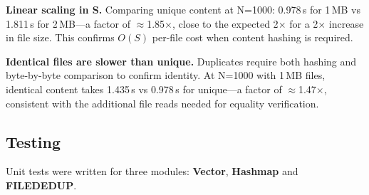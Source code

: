 \textbf{Linear scaling in S.}
Comparing unique content at N=1000: 0.978\,s for 1\,MB vs 1.811\,s for 2\,MB---a
factor of $\approx$1.85$\times$, close to the expected 2$\times$ for a 2$\times$
increase in file size.
This confirms $O(S)$ per-file cost when content hashing is required.

\textbf{Identical files are slower than unique.}
Duplicates require both hashing and byte-by-byte comparison to confirm
identity.
At N=1000 with 1\,MB files, identical content takes 1.435\,s vs 0.978\,s
for unique---a factor of $\approx$1.47$\times$, consistent with the additional
file reads needed for equality verification.

\subsection{Testing}

Unit tests were written for three modules: \textbf{Vector}, \textbf{Hashmap} and \textbf{FILEDEDUP}.
